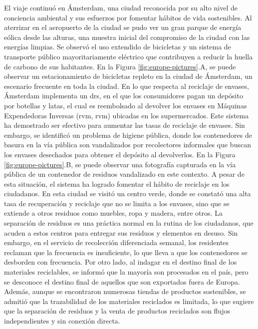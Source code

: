 El viaje continuó en Ámsterdam, una ciudad reconocida por su alto nivel de conciencia ambiental y sus esfuerzos por fomentar hábitos de vida sostenibles. Al aterrizar en el aeropuerto de la ciudad se pudo ver un gran parque de energía eólica desde las alturas, una muestra inicial del compromiso de la ciudad con las energías limpias. Se observó el uso extendido de bicicletas y un sistema de transporte público mayoritariamente eléctrico que contribuyen a reducir la huella de carbono de sus habitantes. En la Figura \ref{fig:europe-pictures}.A, se puede observar un estacionamiento de bicicletas repleto en la ciudad de Ámsterdam, un escenario frecuente en toda la ciudad. En lo que respecta al reciclaje de envases, Ámsterdam implementa un \gls{drs}, en el que los consumidores pagan un depósito por botellas y latas, el cual es reembolsado al devolver los envases en Máquinas Expendedoras Inversas (\acrshort{rvm}, \acrlong{rvm}) ubicadas en los supermercados. Este sistema ha demostrado ser efectivo para aumentar las tasas de reciclaje de envases. Sin embargo, se identificó un problema de higiene pública, donde los contenedores de basura en la vía pública son vandalizados por recolectores informales que buscan los envases desechados para obtener el depósito al devolverlos. En la Figura \ref{fig:europe-pictures}.B, se puede observar una fotografía capturada en la vía pública de un contenedor de residuos vandalizado en este contexto. A pesar de esta situación, el sistema ha logrado fomentar el hábito de reciclaje en los ciudadanos. En esta ciudad se visitó un centro verde, donde se constató una alta tasa de recuperación y reciclaje que no se limita a los envases, sino que se extiende a otros residuos como muebles, ropa y madera, entre otros. La separación de residuos es una práctica normal en la rutina de los ciudadanos, que acuden a estos centros para entregar sus residuos y elementos en desuso. Sin embargo, en el servicio de recolección diferenciada semanal, los residentes reclaman que la frecuencia es insuficiente, lo que lleva a que los contenedores se desborden con frecuencia. Por otro lado, al indagar en el destino final de los materiales reciclables, se informó que la mayoría son procesados en el país, pero se desconoce el destino final de aquellos que son exportados fuera de Europa. Además, aunque se encontraron numerosas tiendas de productos sostenibles, se admitió que la \gls{trazabilidad} de los materiales reciclados es limitada, lo que sugiere que la separación de residuos y la venta de productos reciclados son flujos independientes y sin conexión directa.

